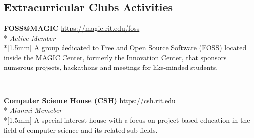 \documentclass[a4paper,margin,line]{resume}
\newcommand{\rvspace}{1.5mm} %
\newcommand{\rurl}[1]{\hfill {\footnotesize \url{#1}}}
\newcommand{\rdescription}[1]{\small #1 \normalsize}
\newcommand{\rorganization}[4] {
    \item{\bf #1}                           %
    \rurl{#2} \\*                           %
    \hfill {\small \emph{#3}} \\*[\rvspace] %
    \rdescription{#4}                       %
}
\begin{document}
\begin{resume}
\section{\mysidestyle Extracurricular Clubs Activities}
	\begin{asparablank}
        \rorganization {FOSS@MAGIC}
                       {https://magic.rit.edu/foss}
                       {Active Member}
        {
            A group dedicated to Free and Open Source Software (FOSS) located
            inside the MAGIC Center, formerly the Innovation Center, that
            sponsors numerous projects, hackathons and meetings for like-minded
            students.
        }
        \\

        \rorganization{Computer Science House ({\small CSH})}
                      {https://csh.rit.edu}
                      {Alumni Memeber}
        {
            A special interest house with a focus on project-based education in
            the field of computer science and its related sub-fields.
        }
    \end{asparablank}
\end{resume}
\end{document}
